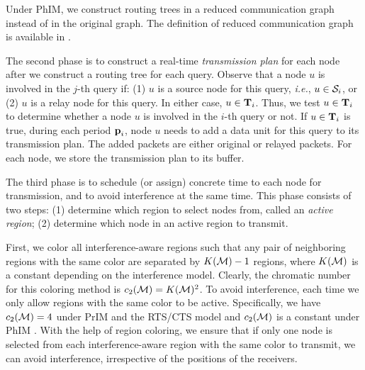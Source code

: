 \documentclass[conference,10pt]{IEEEtran}\usepackage{amsmath}
\def\sources{{\cal S}}
\def\actree{{\textbf T}}
\def\period{{\textbf p}}
\def\ie{\textit{i.e.}\xspace}
\begin{document}
Under PhIM,
 we construct routing trees
 in a reduced communication graph instead
of in the original graph.
The definition of reduced communication graph is available in \cite{xu2012TMC}.

The second phase is to construct a real-time \emph{transmission
 plan} for each node after we construct a routing tree for each query.
Observe that a node $u$ is involved in the $j$-th query
 if: (1) $u$ is a source node for this query, \ie, $u\in \sources_i$,
 or (2) $u$ is a relay node for this query.
In either case,  $u\in \actree_i$.
Thus, we test $u\in
\actree_i$ to determine
 whether a node $u$ is involved in the $i$-th query or not.
If $u\in \actree_i$ is true, during each period
$\period_i$,
 node $u$ needs to add a data unit for this query to its transmission plan.
The added packets are either original  or
 relayed packets.
For each node, we store the transmission plan to its buffer.

The third phase is to schedule (or assign) concrete time to each
node
 for transmission,
 and to avoid interference at the same time.
This phase consists of two steps: (1) determine which
region to select nodes from, called an \emph{active region}; (2)
determine which node in an active region to transmit.

First, we color all interference-aware regions
 such that any pair of neighboring regions with the same
 color are separated by $K({\cal M})-1$ regions, where $K({\cal M})$ is a constant
 depending on the interference model.
Clearly, the chromatic number for this coloring method is $c_2({\cal
 M})=K({\cal M})^2$.
To avoid interference, each time we only allow regions with the same
 color to be active.
Specifically, we have $c_2({\cal M}) =4$ under
  PrIM and the RTS/CTS model and $c_2(\cal
 M)$ is a constant under PhIM \cite{xu2012TMC}.
With the help of region coloring, we ensure that if
 only one node is selected from each interference-aware region with
 the same color to transmit, we can avoid interference, irrespective of the positions of
 the receivers.
\end{document}
